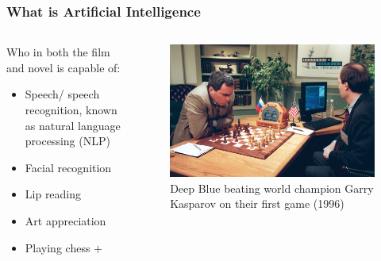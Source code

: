 \documentclass[aspectratio=169]{beamer}
\begin{document}
  \begin{frame}
    \frametitle{What is Artificial Intelligence}
    \begin{columns}
      \begin{column}{0.5\textwidth}
        Who in both the film and novel is capable of:
        \begin{itemize}
          \item Speech/ speech recognition, known as natural language processing (NLP)
          \item Facial recognition
          \item Lip reading
          \item Art appreciation
          \item Playing chess $+$
        \end{itemize}
      \end{column}
      \begin{column}{0.5\textwidth}
        \begin{figure}[th!]
          \centering
          \includegraphics[width=1\textwidth]{deep-blue.jpg}
          \caption{Deep Blue beating world champion Garry Kasparov on their first game (1996)}
          \label{fig:jim_carrey}
        \end{figure}
      \end{column}
    \end{columns}
  \end{frame}
\end{document}
